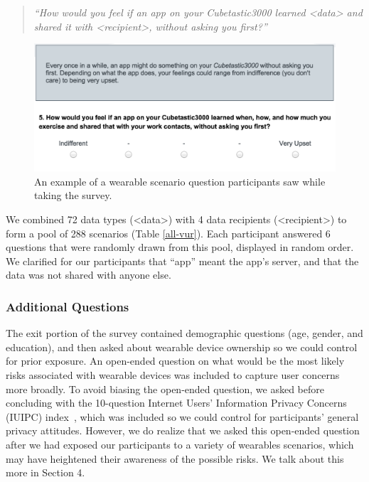 \documentclass[conference]{IEEEtran}
\begin{document}
\begin{quotation}
\noindent
\textit{``How would you feel if an app on your Cubetastic3000 learned <data> and shared it with <recipient>, without asking you first?''}
\end{quotation}

\begin{figure}[t]
	\centering
	\includegraphics[width=\columnwidth]{prompt.png}
	\caption{An example of a wearable scenario question participants saw while taking the survey.}
	\label{fig:prompt}
\end{figure}

We combined 72 data types (<data>) with 4 data recipients (<recipient>) to form a pool of 288 scenarios (Table \ref{all-vur}). Each participant answered 6 questions that were randomly drawn from this pool, displayed in random order. We clarified for our participants that ``app'' meant the app's server, and that the data was not shared with anyone else. 

\subsubsection{Additional Questions}
The exit portion of the survey contained demographic questions (age, gender, and education), and then asked about wearable device ownership so we could control for prior exposure. An open-ended question on what would be the most likely risks associated with wearable devices was included to capture user concerns more broadly. To avoid biasing the open-ended question, we asked before concluding with the 10-question Internet Users' Information Privacy Concerns (IUIPC) index~\cite{malhotra2004internet}, which was included so we could control for participants' general privacy attitudes. However, we do realize that we asked this open-ended question after we had exposed our participants to a variety of wearables scenarios, which may have heightened their awareness of the possible risks. We talk about this more in Section 4. 
\end{document}
